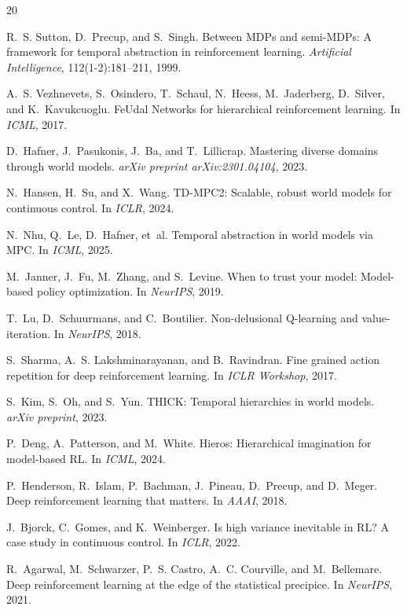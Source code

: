 \documentclass[letterpaper]{article}
\begin{document}

\begin{thebibliography}{20}

R.~S. Sutton, D.~Precup, and S.~Singh.
\newblock Between MDPs and semi-MDPs: A framework for temporal abstraction in reinforcement learning.
\newblock \emph{Artificial Intelligence}, 112(1-2):181--211, 1999.

A.~S. Vezhnevets, S.~Osindero, T.~Schaul, N.~Heess, M.~Jaderberg, D.~Silver, and K.~Kavukcuoglu.
\newblock FeUdal Networks for hierarchical reinforcement learning.
\newblock In \emph{ICML}, 2017.

D.~Hafner, J.~Pasukonis, J.~Ba, and T.~Lillicrap.
\newblock Mastering diverse domains through world models.
\newblock \emph{arXiv preprint arXiv:2301.04104}, 2023.

N.~Hansen, H.~Su, and X.~Wang.
\newblock TD-MPC2: Scalable, robust world models for continuous control.
\newblock In \emph{ICLR}, 2024.

N.~Nhu, Q.~Le, D.~Hafner, et~al.
\newblock Temporal abstraction in world models via MPC.
\newblock In \emph{ICML}, 2025.

M.~Janner, J.~Fu, M.~Zhang, and S.~Levine.
\newblock When to trust your model: Model-based policy optimization.
\newblock In \emph{NeurIPS}, 2019.

T.~Lu, D.~Schuurmans, and C.~Boutilier.
\newblock Non-delusional Q-learning and value-iteration.
\newblock In \emph{NeurIPS}, 2018.

S.~Sharma, A.~S. Lakshminarayanan, and B.~Ravindran.
\newblock Fine grained action repetition for deep reinforcement learning.
\newblock In \emph{ICLR Workshop}, 2017.

S.~Kim, S.~Oh, and S.~Yun.
\newblock THICK: Temporal hierarchies in world models.
\newblock \emph{arXiv preprint}, 2023.

P.~Deng, A.~Patterson, and M.~White.
\newblock Hieros: Hierarchical imagination for model-based RL.
\newblock In \emph{ICML}, 2024.

P.~Henderson, R.~Islam, P.~Bachman, J.~Pineau, D.~Precup, and D.~Meger.
\newblock Deep reinforcement learning that matters.
\newblock In \emph{AAAI}, 2018.

J.~Bjorck, C.~Gomes, and K.~Weinberger.
\newblock Is high variance inevitable in RL? A case study in continuous control.
\newblock In \emph{ICLR}, 2022.

R.~Agarwal, M.~Schwarzer, P.~S. Castro, A.~C. Courville, and M.~Bellemare.
\newblock Deep reinforcement learning at the edge of the statistical precipice.
\newblock In \emph{NeurIPS}, 2021.

\end{thebibliography}
\end{document}
